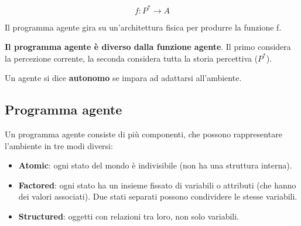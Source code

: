 \begin{equation}
f: P^* \rightarrow A
\end{equation}

Il programma agente gira su un'architettura fisica per produrre la funzione f.

\textbf{Il programma agente è diverso dalla funzione agente}.
Il primo considera la percezione corrente, la seconda considera tutta la
storia percettiva ($P^*$).

Un agente si dice \textbf{autonomo} se impara ad adattarsi all'ambiente.

\subsection{Programma agente}

Un programma agente consiste di più componenti, che possono rappresentare
l'ambiente in tre modi diversi:

\begin{itemize}
 \item \textbf{Atomic}: ogni stato del mondo è indivisibile (non ha una
struttura interna).
 \item \textbf{Factored}: ogni stato ha un insieme fissato di variabili o
attributi (che hanno dei valori associati).
Due stati separati possono condividere le stesse variabili.
 \item \textbf{Structured}: oggetti con relazioni tra loro, non solo
variabili.
\end{itemize}
